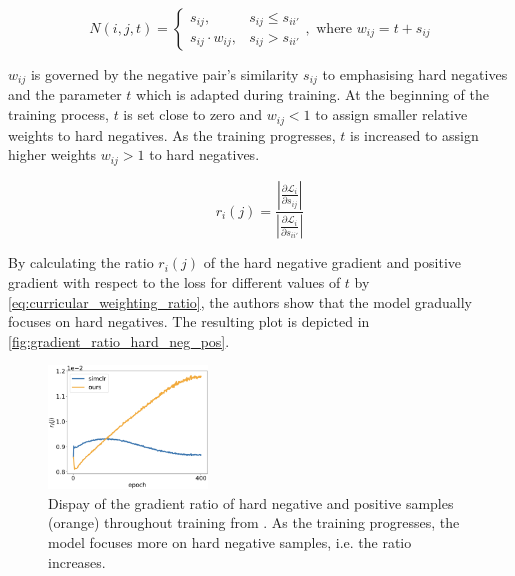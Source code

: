 \begin{equation}
    N(i,j,t) = \left\{\begin{array}{ll} s_{ij}, & s_{ij} \le s_{ii'} \\
        s_{ij} \cdot  w_{ij}, & s_{ij} > s_{ii'}\end{array}\right. ,\text{ where }w_{ij} = t + s_{ij}
    \label{eq:curricular_negative_weighting}
\end{equation}

$w_{ij}$ is governed by the negative pair's similarity $s_{ij}$ to emphasising hard negatives 
and the parameter $t$ which is adapted during training.
At the beginning of the training process, $t$ is set close to zero and $w_{ij} < 1$ 
to assign smaller relative weights to hard negatives.
As the training progresses, $t$ is increased to assign higher weights $w_{ij} > 1$ to hard negatives.

\begin{equation}
    r_i(j) = \frac{\left| \frac{\partial \mathcal{L}_i}{\partial s_{ij}} \right|}
    {\left| \frac{\partial \mathcal{L}_i}{\partial s_{ii'}} \right|}
    \label{eq:curricular_weighting_ratio}
\end{equation}


By calculating the ratio $r_i(j)$ of the hard negative gradient and positive gradient 
with respect to the loss for different values of $t$ by \eqref{eq:curricular_weighting_ratio}, 
the authors show that the model gradually focuses on hard negatives.
The resulting plot is depicted in \autoref{fig:gradient_ratio_hard_neg_pos}.

\begin{figure}[h] %
    \centering
    \includegraphics[width=120pt]{images/ratio_hard_neg_pos_gradients.png}
    \caption{Dispay of the gradient ratio of hard negative and positive samples (orange) throughout training 
    from \citet{curricular_weighting_2024}.
    As the training progresses, the model focuses more on hard negative samples, i.e. the ratio increases.
    }
    \label{fig:gradient_ratio_hard_neg_pos}
\end{figure}

